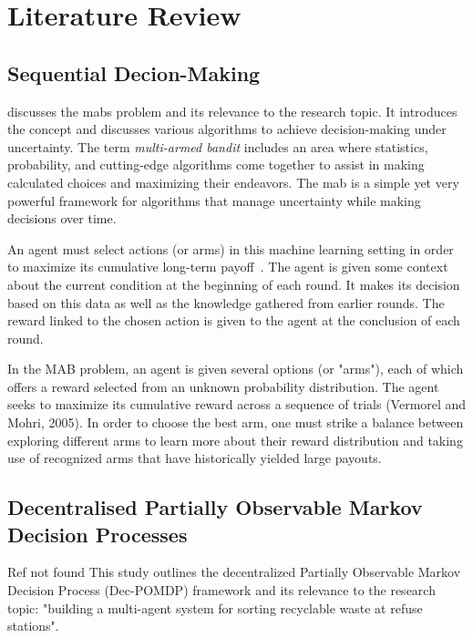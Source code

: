 \section{Literature Review}
\label{sec:Literature Review} %

\subsection{Sequential Decion-Making}
\label{sub:lit-rev_sequential-decion} %

\Cite{slivkins:2024} discusses the \glspl{mab}  problem and its relevance to the research topic. It introduces the concept and discusses various algorithms to achieve decision-making under uncertainty. The term \emph{multi-armed bandit} includes an area where statistics, probability, and cutting-edge algorithms come together to assist in making calculated choices and maximizing their endeavors. The \gls{mab} is a simple yet very powerful framework for algorithms that manage uncertainty while making decisions over time. 

An agent must select actions (or arms) in this machine learning setting in order to maximize its cumulative long-term payoff~\cite{zhao:2025}. The agent is given some context about the current condition at the beginning of each round. It makes its decision based on this data as well as the knowledge gathered from earlier rounds. The reward linked to the chosen action is given to the agent at the conclusion of each round.

In the MAB problem, an agent is given several options (or "arms"), each of which offers a reward selected from an unknown probability distribution. The agent seeks to maximize its cumulative reward across a sequence of trials (Vermorel and Mohri, 2005). In order to choose the best arm, one must strike a balance between exploring different arms to learn more about their reward distribution and taking use of recognized arms that have historically yielded large payouts.


\subsection{Decentralised Partially Observable Markov Decision Processes}
\label{sub:lit-rev_dec-pomdp}

Ref not found
This study outlines the decentralized Partially Observable Markov Decision Process (Dec-POMDP) framework and its relevance to the research topic: "building a multi-agent system for sorting recyclable waste at refuse stations".


